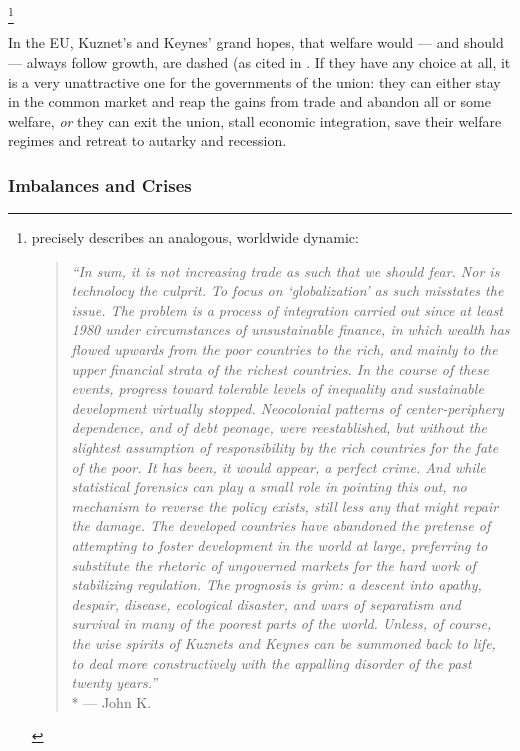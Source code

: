 \footnote{
	\citeauthor[25]{Galbraith2002a} precisely describes an analogous, worldwide dynamic:
	\begin{quote}
		\emph{``In sum, it is not increasing trade \emph{as such} that we should fear.
		Nor is technolocy the culprit.
		To focus on `globalization' as such misstates the issue.
		The problem is a process of integration carried out since at least 1980 under circumstances of unsustainable finance, in which wealth has flowed upwards from the poor countries to the rich, and mainly to the upper financial strata of the richest countries.
		In the course of these events, progress toward tolerable levels of inequality and sustainable development virtually stopped.
		Neocolonial patterns of center-periphery dependence, and of debt peonage, were reestablished, but without the slightest assumption of responsibility by the rich countries for the fate of the poor.
		It has been, it would appear, a perfect crime.
		And while statistical forensics can play a small role in pointing this out, no mechanism to reverse the policy exists, still less any that might repair the damage.
		The developed countries have abandoned the pretense of attempting to foster development in the world at large, preferring to substitute the rhetoric of ungoverned markets for the hard work of stabilizing regulation.
		The prognosis is grim:
		a descent into apathy, despair, disease, ecological disaster, and wars of separatism and survival in many of the poorest parts of the world.
		Unless, of course, the wise spirits of Kuznets and Keynes can be summoned back to life, to deal more constructively with the appalling disorder of the past twenty years.''}
		\\*
		--- John K.\ \citet[25]{Galbraith2002a}
	\end{quote}
}

In the \gls{EU}, Kuznet's and Keynes' grand hopes, that welfare would --- and should --- always follow growth, are dashed (as cited in \cite[22]{Galbraith2002a}.
If they have any choice at all, it is a very unattractive one for the governments of the union:
they can either stay in the common market and reap the gains from trade and abandon all or some welfare, \emph{or} they can exit the union, stall economic integration, save their welfare regimes and retreat to autarky and recession.

\subsubsection{Imbalances and Crises} \label{sec:imbalances}

